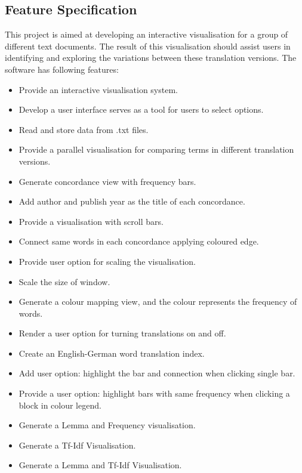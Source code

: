 \subsection{Feature Specification}
This project is aimed at developing an interactive visualisation for a group of different text documents. The result of this visualisation should assist users in identifying and exploring the variations between these translation versions. The software has following features:
\begin{itemize}
	\item \textbf{} Provide an interactive visualisation system.
	\item \textbf{} Develop a user interface serves as a tool for users to select options.
	\item \textbf{} Read and store data from .txt files.
	\item \textbf{} Provide a parallel visualisation for comparing terms in different translation versions.
	\item \textbf{} Generate concordance view with frequency bars.
	\item \textbf{} Add author and publish year as the title of each concordance.
	\item \textbf{} Provide a visualisation with scroll bars.
	\item \textbf{} Connect same words in each concordance applying coloured edge.
	\item \textbf{} Provide user option for scaling the visualisation.
	\item \textbf{} Scale the size of window.
	\item \textbf{} Generate a colour mapping view, and the colour represents the frequency of words.
	\item \textbf{} Render a user option for turning translations on and off.
	\item \textbf{} Create an English-German word translation index.
	\item \textbf{} Add user option: highlight the bar and connection when clicking single bar.
	\item \textbf{} Provide a user option: highlight bars with same frequency when clicking a block in colour legend.
	\item \textbf{} Generate a Lemma and Frequency visualisation.
	\item \textbf{} Generate a Tf-Idf Visualisation.
	\item \textbf{} Generate a Lemma and Tf-Idf  Visualisation.
\end{itemize}

